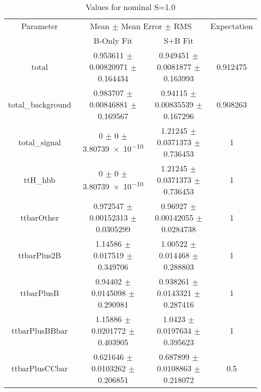 \begin{table}
\centering
\caption{Values for nominal S=1.0}
\begin{tabular}{cccc}
\toprule
Parameter & \multicolumn{2}{c}{Mean $\pm$ Mean Error $\pm$ RMS} & Expectation\\
 & B-Only Fit & S+B Fit & \\
\midrule
total & \num{0.953611} $\pm$ \num{0.00820971} $\pm$ \num{0.164434} & \num{0.949451} $\pm$ \num{0.0081877} $\pm$ \num{0.163993} & \num{0.912475}\\
total\_background & \num{0.983707} $\pm$ \num{0.00846881} $\pm$ \num{0.169567} & \num{0.94115} $\pm$ \num{0.00835539} $\pm$ \num{0.167296} & \num{0.908263}\\
total\_signal & \num{0} $\pm$ \num{0} $\pm$ \num{3.80739e-10} & \num{1.21245} $\pm$ \num{0.0371373} $\pm$ \num{0.736453} & \num{1}\\
ttH\_hbb & \num{0} $\pm$ \num{0} $\pm$ \num{3.80739e-10} & \num{1.21245} $\pm$ \num{0.0371373} $\pm$ \num{0.736453} & \num{1}\\
ttbarOther & \num{0.972547} $\pm$ \num{0.00152313} $\pm$ \num{0.0305299} & \num{0.96927} $\pm$ \num{0.00142055} $\pm$ \num{0.0284738} & \num{1}\\
ttbarPlus2B & \num{1.14586} $\pm$ \num{0.017519} $\pm$ \num{0.349706} & \num{1.00522} $\pm$ \num{0.014468} $\pm$ \num{0.288803} & \num{1}\\
ttbarPlusB & \num{0.94402} $\pm$ \num{0.0145098} $\pm$ \num{0.290981} & \num{0.938261} $\pm$ \num{0.0143321} $\pm$ \num{0.287416} & \num{1}\\
ttbarPlusBBbar & \num{1.15886} $\pm$ \num{0.0201772} $\pm$ \num{0.403905} & \num{1.0423} $\pm$ \num{0.0197634} $\pm$ \num{0.395623} & \num{1}\\
ttbarPlusCCbar & \num{0.621646} $\pm$ \num{0.0103262} $\pm$ \num{0.206851} & \num{0.687899} $\pm$ \num{0.0108863} $\pm$ \num{0.218072} & \num{0.5}\\
\bottomrule
\end{tabular}
\end{table}